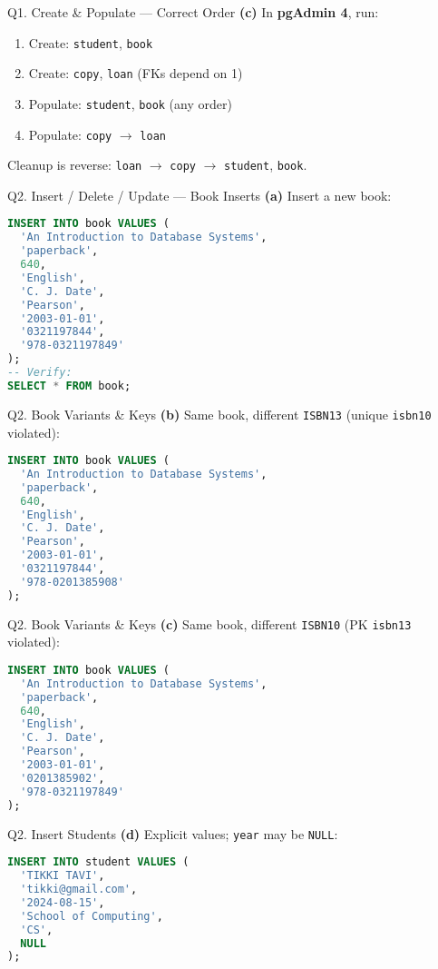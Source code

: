 \documentclass{beamer}
\begin{document}
\begin{frame}{Q1. Create \& Populate — Correct Order}
\textbf{(c)} In \textbf{pgAdmin 4}, run:
\begin{enumerate}
  \item Create: \texttt{student}, \texttt{book}
  \item Create: \texttt{copy}, \texttt{loan} (FKs depend on 1)
  \item Populate: \texttt{student}, \texttt{book} (any order)
  \item Populate: \texttt{copy} $\to$ \texttt{loan}
\end{enumerate}
Cleanup is reverse: \texttt{loan} $\to$ \texttt{copy} $\to$ \texttt{student}, \texttt{book}.
\end{frame}

\begin{frame}[fragile]{Q2. Insert / Delete / Update — Book Inserts}
\textbf{(a)} Insert a new book:
\begin{lstlisting}[language=SQL]
INSERT INTO book VALUES (
  'An Introduction to Database Systems',
  'paperback',
  640,
  'English',
  'C. J. Date',
  'Pearson',
  '2003-01-01',
  '0321197844',
  '978-0321197849'
);
-- Verify:
SELECT * FROM book;
\end{lstlisting}
\end{frame}

\begin{frame}[fragile]{Q2. Book Variants \& Keys}
\textbf{(b)} Same book, different \texttt{ISBN13} (unique \texttt{isbn10} violated):
\begin{lstlisting}[language=SQL]
INSERT INTO book VALUES (
  'An Introduction to Database Systems',
  'paperback',
  640,
  'English',
  'C. J. Date',
  'Pearson',
  '2003-01-01',
  '0321197844',
  '978-0201385908'
);
\end{lstlisting}
\end{frame}
\begin{frame}[fragile]{Q2. Book Variants \& Keys}
\textbf{(c)} Same book, different \texttt{ISBN10} (PK \texttt{isbn13} violated):
\begin{lstlisting}[language=SQL]
INSERT INTO book VALUES (
  'An Introduction to Database Systems',
  'paperback',
  640,
  'English',
  'C. J. Date',
  'Pearson',
  '2003-01-01',
  '0201385902',
  '978-0321197849'
);
\end{lstlisting}
\end{frame}

\begin{frame}[fragile]{Q2. Insert Students}
\textbf{(d)} Explicit values; \texttt{year} may be \texttt{NULL}:
\begin{lstlisting}[language=SQL]
INSERT INTO student VALUES (
  'TIKKI TAVI',
  'tikki@gmail.com',
  '2024-08-15',
  'School of Computing',
  'CS',
  NULL
);
\end{lstlisting}
\end{frame}
\end{document}
